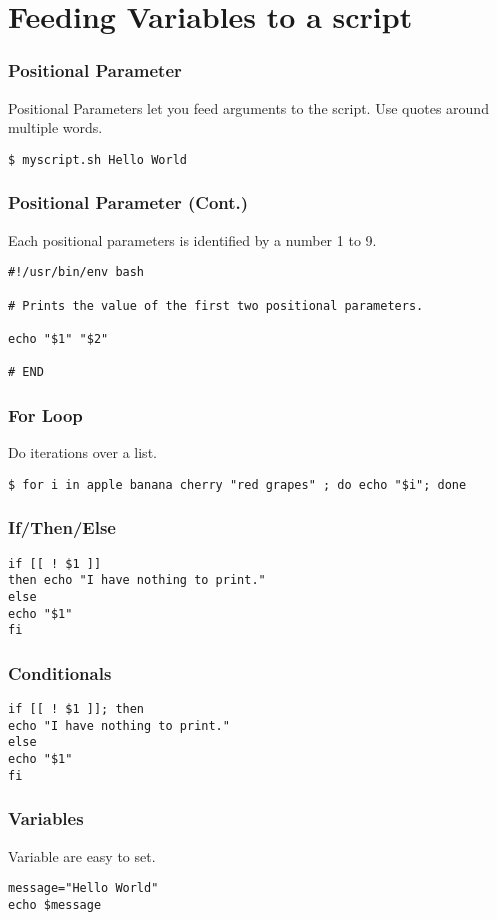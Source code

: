 \documentclass[handout]{beamer}
\begin{document}
\section{Feeding Variables to a script}

\begin{frame}[fragile]
  \frametitle{Positional Parameter}
  Positional Parameters let you feed arguments to the script. Use quotes around multiple words.
\begin{block}{}
\begin{verbatim}
$ myscript.sh Hello World
\end{verbatim}
\end{block}
\end{frame}
\begin{frame}[fragile]
  \frametitle{Positional Parameter (Cont.)}
  Each positional parameters is identified by a number 1 to 9.
\begin{block}{}
\begin{verbatim}
#!/usr/bin/env bash

# Prints the value of the first two positional parameters.

echo "$1" "$2"

# END
\end{verbatim}
\end{block}
\end{frame}
\begin{frame}[fragile]
  \frametitle{For Loop}
  Do iterations over a list.
\begin{verbatim}
$ for i in apple banana cherry "red grapes" ; do echo "$i"; done
\end{verbatim}
\end{frame}
\begin{frame}[fragile]
  \frametitle{If/Then/Else}
\begin{block}{}
\begin{verbatim}
if [[ ! $1 ]]
then echo "I have nothing to print."
else
echo "$1"
fi
\end{verbatim}
\end{block}
\end{frame}
\begin{frame}[fragile]
  \frametitle{Conditionals}
\begin{verbatim}
if [[ ! $1 ]]; then
echo "I have nothing to print."
else
echo "$1"
fi
\end{verbatim}
\end{frame}
\begin{frame}[fragile]
  \frametitle{Variables}
  Variable are easy to set.
\begin{verbatim}
message="Hello World"
echo $message
\end{verbatim}

\end{frame}
\end{document}
